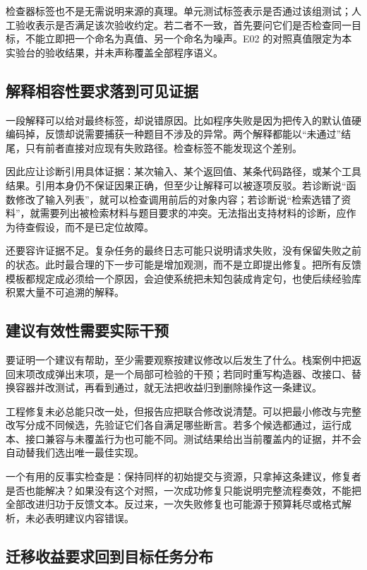 检查器标签也不是无需说明来源的真理。单元测试标签表示是否通过该组测试；人工验收表示是否满足该次验收约定。若二者不一致，首先要问它们是否检查同一目标，不能立即把一个命名为真值、另一个命名为噪声。E02 的对照真值限定为本实验台的验收结果，并未声称覆盖全部程序语义。

\subsection{解释相容性要求落到可见证据}

一段解释可以给对最终标签，却说错原因。比如程序失败是因为把传入的默认值硬编码掉，反馈却说需要捕获一种题目不涉及的异常。两个解释都能以“未通过”结尾，只有前者直接对应现有失败路径。检查标签不能发现这个差别。

因此应让诊断引用具体证据：某次输入、某个返回值、某条代码路径，或某个工具结果。引用本身仍不保证因果正确，但至少让解释可以被逐项反驳。若诊断说“函数修改了输入列表”，就可以检查调用前后的对象内容；若诊断说“检索选错了资料”，就需要列出被检索材料与题目要求的冲突。无法指出支持材料的诊断，应作为待查假设，而不是已定位故障。

还要容许证据不足。复杂任务的最终日志可能只说明请求失败，没有保留失败之前的状态。此时最合理的下一步可能是增加观测，而不是立即提出修复。把所有反馈模板都规定成必须给一个原因，会迫使系统把未知包装成肯定句，也使后续经验库积累大量不可追溯的解释。

\subsection{建议有效性需要实际干预}

要证明一个建议有帮助，至少需要观察按建议修改以后发生了什么。栈案例中把返回末项改成弹出末项，是一个局部可检验的干预；若同时重写构造器、改接口、替换容器并改测试，再看到通过，就无法把收益归到删除操作这一条建议。

工程修复未必总能只改一处，但报告应把联合修改说清楚。可以把最小修改与完整改写分成不同候选，先验证它们各自满足哪些断言。若多个候选都通过，运行成本、接口兼容与未覆盖行为也可能不同。测试结果给出当前覆盖内的证据，并不会自动替我们选出唯一最佳实现。

一个有用的反事实检查是：保持同样的初始提交与资源，只拿掉这条建议，修复者是否也能解决？如果没有这个对照，一次成功修复只能说明完整流程奏效，不能把全部改进归功于反馈文本。反过来，一次失败修复也可能源于预算耗尽或格式解析，未必表明建议内容错误。

\subsection{迁移收益要求回到目标任务分布}

